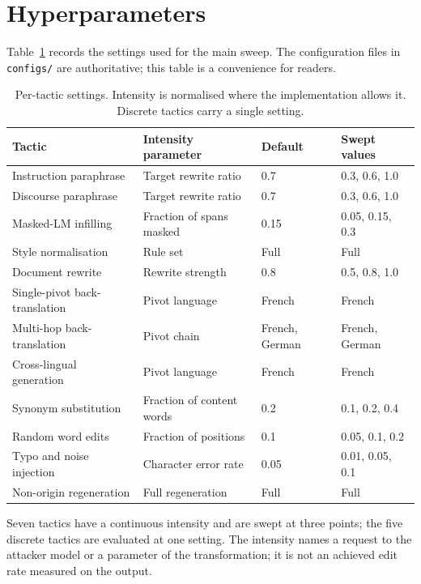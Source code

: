 \section{Hyperparameters}
\label{app:hyper}

Table~\ref{tab:hyper} records the settings used for the main sweep. The configuration files in \texttt{configs/} are authoritative; this table is a convenience for readers.

\begin{table}[h]
\centering
\small
\caption{Per-tactic settings. Intensity is normalised where the implementation allows it. Discrete tactics carry a single setting.}
\label{tab:hyper}
\begin{tabular}{@{}llll@{}}
\toprule
Tactic & Intensity parameter & Default & Swept values \\
\midrule
Instruction paraphrase      & Target rewrite ratio      & 0.7 & 0.3, 0.6, 1.0 \\
Discourse paraphrase        & Target rewrite ratio      & 0.7 & 0.3, 0.6, 1.0 \\
Masked-LM infilling         & Fraction of spans masked  & 0.15 & 0.05, 0.15, 0.3 \\
Style normalisation         & Rule set                  & Full & Full \\
Document rewrite            & Rewrite strength          & 0.8 & 0.5, 0.8, 1.0 \\
Single-pivot back-translation & Pivot language          & French & French \\
Multi-hop back-translation  & Pivot chain               & French, German & French, German \\
Cross-lingual generation    & Pivot language            & French & French \\
Synonym substitution        & Fraction of content words & 0.2 & 0.1, 0.2, 0.4 \\
Random word edits           & Fraction of positions     & 0.1 & 0.05, 0.1, 0.2 \\
Typo and noise injection    & Character error rate      & 0.05 & 0.01, 0.05, 0.1 \\
Non-origin regeneration     & Full regeneration         & Full & Full \\
\bottomrule
\end{tabular}
\end{table}

Seven tactics have a continuous intensity and are swept at three points; the five discrete tactics are evaluated at one setting. The intensity names a request to the attacker model or a parameter of the transformation; it is not an achieved edit rate measured on the output.

